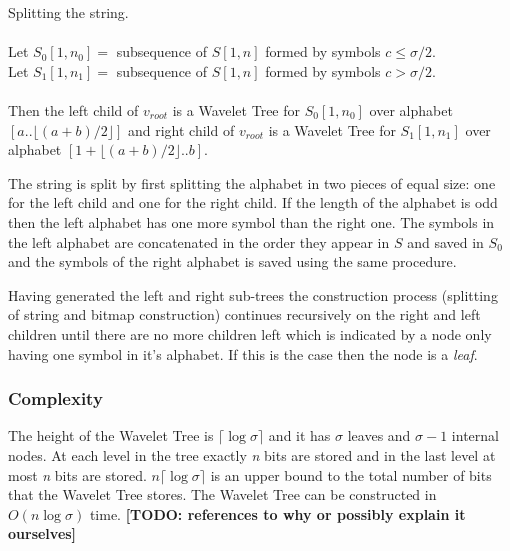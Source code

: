 \vspace{0.5 cm}
\begin{mdframed}[nobreak, linecolor=lightgray, linewidth=2pt]
\begin{definition} Splitting the string. \\\\
Let $S_0[1,n_0] =$ subsequence of $S[1,n]$ formed by symbols $c \leq \sigma/2$.\\
Let $S_1[1,n_1] =$ subsequence of $S[1,n]$ formed by symbols $c > \sigma/2$.\\\\
Then the left child of $v_{root}$ is a Wavelet Tree for $S_0[1,n_0]$ over alphabet $[a .. \lfloor (a + b)/2 \rfloor]$ and right child of $v_{root}$ is a Wavelet Tree for $S_1[1,n_1]$ over alphabet $[1 + \lfloor (a + b)/2 \rfloor .. b]$. 
\end{definition}
\end{mdframed}
\vspace{0.5 cm}

The string is split by first splitting the alphabet in two pieces of equal size: one for the left child and one for the right child.
If the length of the alphabet is odd then the left alphabet has one more symbol than the right one. 
The symbols in the left alphabet are concatenated in the order they appear in $S$ and saved in $S_0$ and the symbols of the right alphabet is saved using the same procedure.
 
Having generated the left and right sub-trees the construction process (splitting of string and bitmap construction) continues recursively on the right and left children until there are no more children left which is indicated by a node only having one symbol in it's alphabet.
If this is the case then the node is a \textit{leaf}.

\subsubsection{Complexity}
The height of the Wavelet Tree is  $\lceil \log \sigma \rceil$ and it has $\sigma$ leaves and $\sigma - 1$ internal nodes. 
At each level in the tree exactly \textit{n} bits are stored and in the last level at most \textit{n} bits are stored. $n \lceil \log \sigma \rceil$ is an upper bound to the total number of bits that the Wavelet Tree stores. 
The Wavelet Tree can be constructed in $O(n \log \sigma)$ time. 
\textbf{[TODO: references to why or possibly explain it ourselves]}\\


